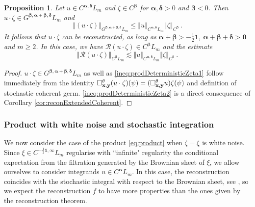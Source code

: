 \documentclass[12pt]{article}
\numberwithin{equation}{section}
\theoremstyle{plain}
\newtheorem{proposition}[theorem]{Proposition}
\theoremstyle{definition}
\newcommand{\norm}[1]{\left\Vert #1\right\Vert}
\def\cR{\mathcal{R}}\def\cE{\mathcal{E}}
\def\fy{\mathbf y}\def\fz{\mathbf z}
\def\falpha{{\boldsymbol\alpha}}
\def\fbeta{{\boldsymbol\beta}}
\def\fdelta{{\boldsymbol\delta}}
\def\foo{{\boldsymbol 0}}
\def\fone{{\boldsymbol 1}}
\begin{document}
\begin{proposition}\label{lem:prodDeterministicZeta}
    Let $u\in C^{\falpha,\fdelta}L_m$ and $\zeta\in C^{\fbeta}$ for $\falpha,\fdelta>0$ and $\fbeta<0$. Then $u\cdot \zeta\in G^{\fbeta,\falpha+\fbeta,\fdelta}L_m$ and
    \begin{equation}\label{ineq:prodDeterministicZeta1}
    \norm{(u\cdot \zeta)}_{G^{\fbeta,\falpha+\fbeta,\fdelta}L_m}\le \norm{u}_{C^{\falpha,\fdelta}L_m}\norm{\zeta}_{C^\fbeta}\,.    
    \end{equation}
    It follows that $u\cdot\zeta$ can be reconstructed, as long as $\falpha+\fbeta > -\frac 12\fone$, $ \falpha+\fbeta+\fdelta > \foo$ and $m\ge 2$. In this case, we have $\cR(u\cdot\zeta)\in C^{\fbeta}L_m$ and the estimate
    \begin{equation}\label{ineq:prodDeterministicZeta2}
    \norm{\cR(u\cdot\zeta)}_{C^\fbeta L_m} \lesssim \norm{u}_{C^{\falpha,\fdelta}L_m}\norm{\zeta}_{C^\fbeta}\,.
    \end{equation}
\end{proposition}
\begin{proof}
    $u\cdot\zeta\in G^{\fbeta,\falpha+\fbeta, \fdelta}L_m$ as well as \eqref{ineq:prodDeterministicZeta1} follow immediately from the identity $\square^\theta_{\fx,\fy} (u\cdot \zeta)(\psi) = (\square_{\fx,\fy}^\theta u)\zeta(\psi)$ and definition of stochastic coherent germ. \eqref{ineq:prodDeterministicZeta2} is a direct consequence of Corollary \ref{cor:reconExtendedCoherent}.
\end{proof}


\subsubsection*{Product with white noise and stochastic integration}

We now consider the case of the product \eqref{eq:product} when $\zeta = \xi$ is white noise. Since $\xi\in C^{-\frac 12\fone,\infty}L_m$  regularise with ``infinite" regularity the conditional expectation from the filtration generated by the Brownian sheet  of $\xi$, we allow ourselves to consider integrands  $u\in C^{\falpha}L_m$. In this case, the reconstruction coincides with the stochastic integral with respect to the Brownian sheet, see \cite[Section 7]{kern2021}, \cite{Cairoli1975}
so we expect the reconstruction $f$ to have more properties than the ones given by the reconstruction theorem. 
\end{document}
